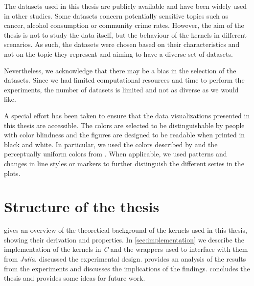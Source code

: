 The datasets used in this thesis are publicly available and have been widely
used in other studies. Some datasets concern potentially sensitive topics such
as cancer, alcohol consumption or community crime rates. However, the aim of the
thesis is not to study the data itself, but the behaviour of the kernels in
different scenarios. As such, the datasets were chosen based on their
characteristics and not on the topic they represent and aiming to have a diverse
set of datasets.

Nevertheless, we acknowledge that there may be a bias in the selection of the
datasets. Since we had limited computational resources and time to perform the
experiments, the number of datasets is limited and not as diverse as we would
like.

A special effort has been taken to ensure that the data visualizations
presented in this thesis are accessible. The colors are selected to be
distinguishable by people with color blindness and the figures are designed to
be readable when printed in black and white. In particular,
we used the colors described by \textcite{wongPointsViewColor2011} and
the perceptually uniform colors from \textcite{crameriScientificColourMaps2023}.
When applicable, we used patterns and changes in line styles or markers to
further distinguish the different series in the plots.


\section{Structure of the thesis}

 gives an overview of the theoretical
background of the kernels used in this thesis, showing their derivation and
properties. In \cref{sec:implementation} we describe the implementation of the
kernels in \emph{C} and the wrappers used to interface with them from
\emph{Julia}.  discussed the experimental design.
 provides an analysis of the results from the experiments
and discusses the implications of the findings.
 concludes the thesis and provides some ideas for future
work.


